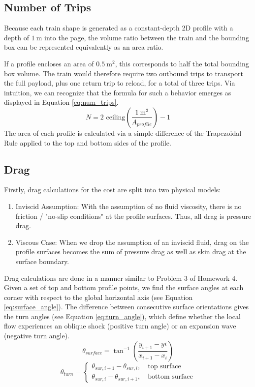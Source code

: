 \documentclass[11pt]{article}
\begin{document}
\subsection{Number of Trips}
Because each train shape is generated as a constant-depth 2D profile with a depth of $\SI{1}{\meter}$ into the page, the volume ratio between the train and the bounding box can be represented equivalently as an area ratio.

If a profile encloses an area of $\SI{0.5}{\meter^2}$, this corresponds to half the total bounding box volume. The train would therefore require two outbound trips to transport the full payload, plus one return trip to reload, for a total of three trips. Via intuition, we can recognize that the formula for such a behavior emerges as displayed in Equation \ref{eq:num_trips}.
\begin{equation}
N = 2 \text{ ceiling}\left(\frac{\SI{1}{\meter^3}}{A_{profile}}\right)-1
\label{eq:num_trips}
\end{equation} 
The area of each profile is calculated via a simple difference of the Trapezoidal Rule applied to the top and bottom sides of the profile.

\subsection{Drag}
Firstly, drag calculations for the cost are split into two physical models:
\begin{enumerate}
    \item Inviscid Assumption: With the assumption of no fluid viscosity, there is no friction / "no-slip conditions" at the profile surfaces. Thus, all drag is pressure drag.
    \item Viscous Case: When we drop the assumption of an inviscid fluid, drag on the profile surfaces becomes the sum of pressure drag as well as skin drag at the surface boundary.
\end{enumerate}
Drag calculations are done in a manner similar to Problem 3 of Homework 4. Given a set of top and bottom profile points, we find the surface angles at each corner with respect to the global horizontal axis (see Equation \ref{eq:surface_angle}). The difference between consecutive surface orientations gives the turn angles (see Equation \ref{eq:turn_angle}), which define whether the local flow experiences an oblique shock (positive turn angle) or an expansion wave (negative turn angle).
\begin{equation}
\theta_{surface}=\tan^{-1}\left( \frac{y_{i+1}-y{i}}{x_{i+1}-x_i}\right) 
\label{eq:surface_angle}
\end{equation}
\begin{equation}
\theta_{turn}=
\begin{cases}
\theta_{sur, i+1}-\theta_{sur, i}, \quad \text{top surface}\\
\theta_{sur, i}-\theta_{sur, i+1}, \quad \text{bottom surface}
\end{cases}
\label{eq:turn_angle}
\end{equation}
\end{document}
